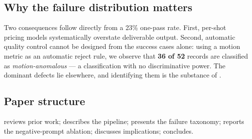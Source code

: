 \subsection{Why the failure distribution matters}

Two consequences follow directly from a 23\% one-pass rate. First, per-shot
pricing models systematically overstate deliverable output. Second, automatic
quality control cannot be designed from the success cases alone: using a
motion metric as an automatic reject rule, we observe that
\textbf{36 of 52} records are classified as \emph{motion-anomalous} — a
classification with no discriminative power. The dominant defects lie
elsewhere, and identifying them is the substance of .

\subsection{Paper structure}

 reviews prior work;  describes the
pipeline;  presents the failure taxonomy;
 reports the negative-prompt ablation;
 discusses implications; 
concludes.

